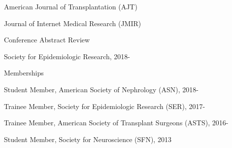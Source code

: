 \documentclass[10pt]{article}
\renewcommand{\section}[1]{\pagebreak[3]%
    \vspace{1.3\baselineskip}%
    \phantomsection\addcontentsline{toc}{section}{#1}%
    \noindent\llap{\scshape\smash{\parbox[t]{\marginparwidth}{\hyphenpenalty=10000\raggedright #1}}}%
    \vspace{-\baselineskip}\par}
\begin{document}
\begin{innerlist}

\item American Journal of Transplantation (AJT)
\item Journal of Internet Medical Research (JMIR)

\end{innerlist}

\vspace{2mm}

Conference Abstract Review

\begin{innerlist}

\item Society for Epidemiologic Research, 2018-

\end{innerlist}

\vspace{2mm}

Memberships

\begin{innerlist}

\item Student Member, American Society of Nephrology (ASN), 2018-
\item Trainee Member, Society for Epidemiologic Research (SER), 2017-
\item Trainee Member, American Society of Transplant Surgeons (ASTS), 2016-
\item Student Member, Society for Neuroscience (SFN), 2013

\end{innerlist}

\end{document}
